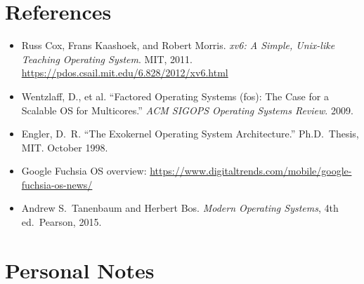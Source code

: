\documentclass[11pt]{article}
\begin{document}
\section{References}

\begin{itemize}
    \item Russ Cox, Frans Kaashoek, and Robert Morris. \textit{xv6: A Simple, Unix-like Teaching Operating System}. MIT, 2011. \url{https://pdos.csail.mit.edu/6.828/2012/xv6.html}
    \item Wentzlaff, D., et al. ``Factored Operating Systems (fos): The Case for a Scalable OS for Multicores.'' \textit{ACM SIGOPS Operating Systems Review}. 2009.
    \item Engler, D.~R. ``The Exokernel Operating System Architecture.'' Ph.D.\ Thesis, MIT. October 1998.
    \item Google Fuchsia OS overview: \url{https://www.digitaltrends.com/mobile/google-fuchsia-os-news/}
    \item Andrew S.\ Tanenbaum and Herbert Bos. \textit{Modern Operating Systems}, 4th ed.\ Pearson, 2015.
\end{itemize}

\section*{Personal Notes}
\end{document}
